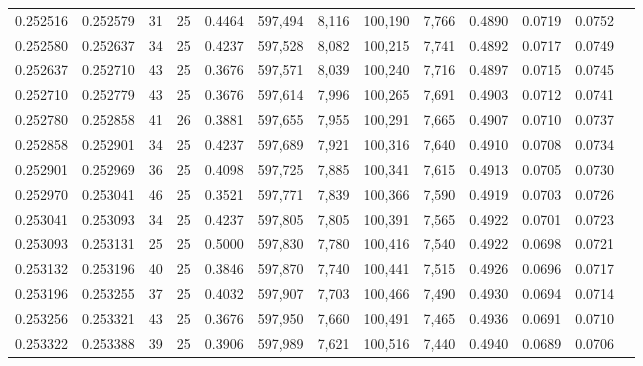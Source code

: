 \begin{tabular}{rrrrrrrrrrrrr}
0.252516 & 0.252579 &    31 &  25 &                                     0.4464 & 597,494 &   8,116 & 100,190 &   7,766 & 0.4890 & 0.0719 & 0.0752 \\
0.252580 & 0.252637 &    34 &  25 &                                     0.4237 & 597,528 &   8,082 & 100,215 &   7,741 & 0.4892 & 0.0717 & 0.0749 \\
0.252637 & 0.252710 &    43 &  25 &                                     0.3676 & 597,571 &   8,039 & 100,240 &   7,716 & 0.4897 & 0.0715 & 0.0745 \\
0.252710 & 0.252779 &    43 &  25 &                                     0.3676 & 597,614 &   7,996 & 100,265 &   7,691 & 0.4903 & 0.0712 & 0.0741 \\
0.252780 & 0.252858 &    41 &  26 &                                     0.3881 & 597,655 &   7,955 & 100,291 &   7,665 & 0.4907 & 0.0710 & 0.0737 \\
0.252858 & 0.252901 &    34 &  25 &                                     0.4237 & 597,689 &   7,921 & 100,316 &   7,640 & 0.4910 & 0.0708 & 0.0734 \\
0.252901 & 0.252969 &    36 &  25 &                                     0.4098 & 597,725 &   7,885 & 100,341 &   7,615 & 0.4913 & 0.0705 & 0.0730 \\
0.252970 & 0.253041 &    46 &  25 &                                     0.3521 & 597,771 &   7,839 & 100,366 &   7,590 & 0.4919 & 0.0703 & 0.0726 \\
0.253041 & 0.253093 &    34 &  25 &                                     0.4237 & 597,805 &   7,805 & 100,391 &   7,565 & 0.4922 & 0.0701 & 0.0723 \\
0.253093 & 0.253131 &    25 &  25 &                                     0.5000 & 597,830 &   7,780 & 100,416 &   7,540 & 0.4922 & 0.0698 & 0.0721 \\
0.253132 & 0.253196 &    40 &  25 &                                     0.3846 & 597,870 &   7,740 & 100,441 &   7,515 & 0.4926 & 0.0696 & 0.0717 \\
0.253196 & 0.253255 &    37 &  25 &                                     0.4032 & 597,907 &   7,703 & 100,466 &   7,490 & 0.4930 & 0.0694 & 0.0714 \\
0.253256 & 0.253321 &    43 &  25 &                                     0.3676 & 597,950 &   7,660 & 100,491 &   7,465 & 0.4936 & 0.0691 & 0.0710 \\
0.253322 & 0.253388 &    39 &  25 &                                     0.3906 & 597,989 &   7,621 & 100,516 &   7,440 & 0.4940 & 0.0689 & 0.0706 \\

\end{tabular}
